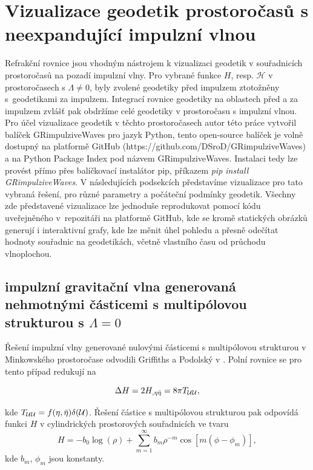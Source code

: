 \section{Vizualizace geodetik prostoročasů s neexpandující impulzní vlnou}
Refrakční rovnice jsou vhodným nástrojem k vizualizaci geodetik v souřadnicích prostoročasů na pozadí impulzní vlny.
Pro vybrané funkce $H$, resp. $\mathcal{H}$ v prostoročasech s $\Lambda \neq 0$, byly zvolené geodetiky před impulzem ztotožněny
s~geodetikami za impulzem. Integrací rovnice geodetiky na oblastech před a za impulzem zvlášť pak obdržíme celé geodetiky v prostoročasu s
impulzní vlnou. Pro účel vizualizace geodetik v těchto prostoročasech autor této práce vytvořil balíček GRimpulziveWaves pro jazyk Python,
tento open-source balíček je volně dostupný na platformě GitHub (https://github.com/DSroD/GRimpulziveWaves) a na Python Package Index pod názvem
GRimpulziveWaves. Instalaci tedy lze provést přímo přes balíčkovací instalátor pip, příkazem \textit{pip install GRimpulziveWaves}. V následujících podsekcích
představíme vizualizace pro tato vybraná řešení, pro různé parametry a počáteční podmínky geodetik. Všechny zde představené vizualizace lze jednoduše reprodukovat
pomocí kódu uveřejněného v~repozitáři na platformě GitHub, kde se kromě statických obrázků generují i interaktivní grafy, kde lze měnit úhel pohledu a přesně odečítat
hodnoty souřadnic na geodetikách, včetně vlastního času od průchodu vlnoplochou.

\subsection{impulzní gravitační vlna generovaná nehmotnými částicemi s multipólovou strukturou s $\Lambda=0$}

Řešení impulzní vlny generované nulovými částicemi s multipólovou strukturou v Minkowského prostoročase odvodili
Griffiths a Podolský v \cite{Griffiths_1997}. Polní rovnice se pro tento případ redukují na

\begin{equation}
    \label{eq:podminka_na_H}
    \Delta H = 2 H_{,\eta \bar{\eta}} = 8 \pi T_{\mathcal{U} \mathcal{U}},
\end{equation}
 
kde $T_{\mathcal{U} \mathcal{U}} = f(\eta, \bar{\eta}) \delta(\mathcal{U})$. Řešení částice s multipólovou strukturou pak odpovídá funkci $H$ v cylindrických prostorových souřadnicích ve tvaru
\begin{equation}
    \label{eq:multipole_minkowski}
    H = -b_0 \log(\rho) + \sum_{m=1}^\infty b_m \rho^{-m} \cos\left[ m \left(\phi - \phi_m \right) \right],
\end{equation}
kde $b_m$, $\phi_m$ jsou konstanty.

